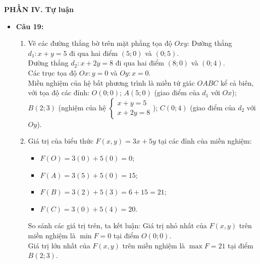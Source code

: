 \documentclass[12pt,a4paper]{article}
\begin{document}
\vspace{0.1cm}
\textbf{PHẦN IV. Tự luận}
\begin{itemize}[leftmargin=0.6cm, itemsep=1.5pt, topsep=1pt]
    \item \textbf{Câu 19:}
    \begin{enumerate}[label=\alph*), itemsep=0.5pt]
        \item Vẽ các đường thẳng bờ trên mặt phẳng tọa độ $Oxy$:
        Đường thẳng $d_1: x + y = 5$ đi qua hai điểm $(5; 0)$ và $(0; 5)$.\\
        Đường thẳng $d_2: x + 2y = 8$ đi qua hai điểm $(8; 0)$ và $(0; 4)$.\\
        Các trục tọa độ $Ox: y = 0$ và $Oy: x = 0$.\\
        Miền nghiệm của hệ bất phương trình là miền tứ giác $OABC$ kể cả biên, với tọa độ các đỉnh:
        $O(0; 0)$; $A(5; 0)$ (giao điểm của $d_1$ với $Ox$); $B(2; 3)$ (nghiệm của hệ $\begin{cases} x + y = 5 \\ x + 2y = 8 \end{cases}$); $C(0; 4)$ (giao điểm của $d_2$ với $Oy$).
        \item Giá trị của biểu thức $F(x, y) = 3x + 5y$ tại các đỉnh của miền nghiệm:
        \begin{itemize}[itemsep=0.5pt]
            \item $F(O) = 3(0) + 5(0) = 0$;
            \item $F(A) = 3(5) + 5(0) = 15$;
            \item $F(B) = 3(2) + 5(3) = 6 + 15 = 21$;
            \item $F(C) = 3(0) + 5(4) = 20$.
        \end{itemize}
        So sánh các giá trị trên, ta kết luận:
        Giá trị nhỏ nhất của $F(x, y)$ trên miền nghiệm là $\min F = 0$ tại điểm $O(0; 0)$.\\
        Giá trị lớn nhất của $F(x, y)$ trên miền nghiệm là $\max F = 21$ tại điểm $B(2; 3)$.
    \end{enumerate}


\end{itemize}
\end{document}
